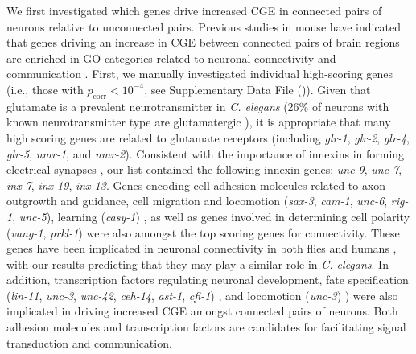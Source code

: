 \documentclass[10pt,letterpaper]{article}
\begin{document}
{We first investigated which genes drive increased CGE in connected pairs of neurons relative to unconnected pairs.
Previous studies in mouse have indicated that genes driving an increase in CGE between connected pairs of brain regions are enriched in GO categories related to neuronal connectivity and communication \cite{Fulcher:2016ck, Ji:2014jw, Fakhry:2015kl, French2011}.
First, we manually investigated individual high-scoring genes (i.e., those with $p_\mathrm{corr} < 10^{-4}$, see Supplementary Data File ()).
Given that glutamate is a prevalent neurotransmitter in \textit{C. elegans} (26\% of neurons with known neurotransmitter type are glutamatergic \cite{Pereira:2015er}), it is appropriate that many high scoring genes are related to glutamate receptors (including \emph{glr-1}, \emph{glr-2}, \emph{glr-4}, \emph{glr-5}, \emph{nmr-1}, and \emph{nmr-2}).
Consistent with the importance of innexins in forming electrical synapses \cite{Starich2001}, our list contained the following innexin genes: \emph{unc-9}, \emph{unc-7}, \emph{inx-7}, \emph{inx-19}, \emph{inx-13}.
Genes encoding cell adhesion molecules related to axon outgrowth and guidance, cell migration and locomotion (\emph{sax-3}, \emph{cam-1}, \emph{unc-6}, \emph{rig-1}, \emph{unc-5}), learning (\emph{casy-1}) \cite{Zallen1999, Garriga1999, Leung-Hagesteijn1992, Harris:2009kd, Ikeda2008},
as well as genes involved in determining cell polarity (\emph{vang-1}, \emph{prkl-1}) \cite{Wu2006, Hoffmann2010} were also amongst the top scoring genes for connectivity.
These genes have been implicated in neuronal connectivity in both flies and humans \cite{Paemka2013, Ehaideb2016, Sowers2013}, with our results predicting that they may play a similar role in \textit{C. elegans}.
In addition, transcription factors regulating neuronal development,
fate specification (\emph{lin-11}, \emph{unc-3}, \emph{unc-42}, \emph{ceh-14}, \emph{ast-1}, \emph{cfi-1}) \cite{Sarafi-Reinach2001, Prasad2008, Baran1999, Cassata2000, Schmid2006, Shaham2002a},
and locomotion (\emph{unc-3}) \cite{Prasad2008}) were also implicated in driving increased CGE amongst connected pairs of neurons.
Both adhesion molecules and transcription factors are candidates for facilitating signal transduction and communication.

}
\end{document}
